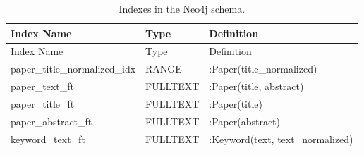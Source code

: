 {
\begin{longtable}{@{}p{5.6cm}p{1.7cm}p{5.8cm}@{}}
\caption{Indexes in the Neo4j schema.}
\label{tab:indexes-general} \\

\toprule
{\raggedright Index Name\par} & {\raggedright Type\par} & {\raggedright Definition\par} \\
\midrule
\endfirsthead

\toprule
{\raggedright Index Name\par} & {\raggedright Type\par} & {\raggedright Definition\par} \\
\midrule
\endhead

\bottomrule
\endfoot

{\raggedright paper\_\allowbreak title\_\allowbreak normalized\_\allowbreak idx\par} & RANGE & {\raggedright :Paper(title\_normalized)\par} \\
{\raggedright paper\_\allowbreak text\_\allowbreak ft\par} & FULLTEXT & {\raggedright :Paper(title, abstract)\par} \\
{\raggedright paper\_\allowbreak title\_\allowbreak ft\par} & FULLTEXT & {\raggedright :Paper(title)\par} \\
{\raggedright paper\_\allowbreak abstract\_\allowbreak ft\par} & FULLTEXT & {\raggedright :Paper(abstract)\par} \\
{\raggedright keyword\_\allowbreak text\_\allowbreak ft\par} & FULLTEXT & {\raggedright :Keyword(text, text\_normalized)\par} \\

\end{longtable}
}

